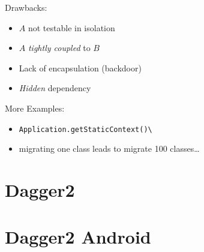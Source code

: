 \documentclass[10pt]{beamer}
\begin{document}
	\begin{frame}[fragile]
		Drawbacks:
		\begin{itemize}
			\item $A$ not testable in isolation 
			\item $A$ \emph{tightly coupled} to $B$
			\item Lack of encapsulation  (backdoor) 
			\item \emph{Hidden} dependency 
		\end{itemize}
	\end{frame}
	\begin{frame}[fragile]
		More Examples:
		\begin{itemize}
			\item \verb|Application.getStaticContext()\|
			\item migrating one class leads to migrate 100 classes\ldots 
		\end{itemize}
	\end{frame}

	\section{Dagger2}
	\section{Dagger2 Android }

% 
% 
\end{document}
